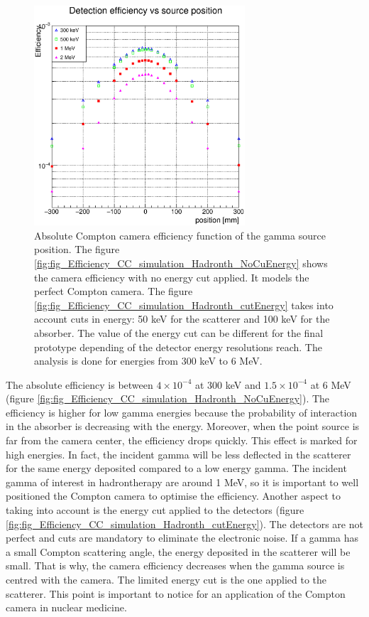 \begin{figure} [!hbtp]	
\centering
\caption{Absolute Compton camera efficiency function of the gamma source position. The figure \ref{fig:fig_Efficiency_CC_simulation_Hadronth_NoCuEnergy} shows the camera efficiency with no energy cut applied. It models the perfect Compton camera. The figure \ref{fig:fig_Efficiency_CC_simulation_Hadronth_cutEnergy} takes into account cuts in energy: 
50 keV for the scatterer and 100 keV for the absorber. The value of the energy cut can be different for the final prototype depending of the detector energy resolutions reach. The analysis is done for energies from 300 keV to 6 MeV.}
\includegraphics[width=0.7\textwidth]{./Figure/2017-06-26_Efficiency_CC_articles.eps}
\end{figure}

The absolute efficiency is between $4\times10^{-4}$ at 300 keV and $1.5\times10^{-4}$ at 6 MeV (figure \ref{fig:fig_Efficiency_CC_simulation_Hadronth_NoCuEnergy}). The efficiency is higher for low gamma energies because the probability of interaction in the absorber is decreasing with the energy. Moreover, when the point source is far from the camera center, the efficiency drops quickly. This effect is marked for high energies. In fact, the incident gamma will be less deflected in the scatterer for the same energy deposited compared to a low energy gamma. The incident gamma of interest in hadrontherapy are around 1 MeV, so it is important to well positioned the Compton camera to optimise the efficiency.\newline
Another aspect to taking into account is the energy cut applied to the detectors (figure \ref{fig:fig_Efficiency_CC_simulation_Hadronth_cutEnergy}). The detectors are not perfect and cuts are mandatory to eliminate the electronic noise. If a gamma has a small Compton scattering angle, the energy deposited in the scatterer will be small. That is why, the camera efficiency decreases when the gamma source is centred with the camera. The limited energy cut is the one applied to the scatterer. This point is important to notice for an application of the Compton camera in nuclear medicine.


